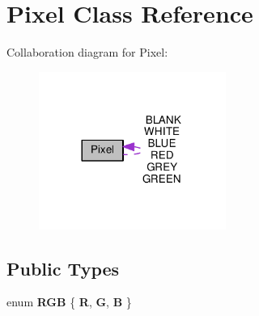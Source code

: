 \hypertarget{class_pixel}{}\section{Pixel Class Reference}
\label{class_pixel}


Collaboration diagram for Pixel\+:\nopagebreak
\begin{figure}[H]
\begin{center}
\leavevmode
\includegraphics[width=173pt]{class_pixel__coll__graph}
\end{center}
\end{figure}
\subsection*{Public Types}
\begin{DoxyCompactItemize}
\item 
enum {\bfseries R\+GB} \{ {\bfseries R}, 
{\bfseries G}, 
{\bfseries B}
 \}\hypertarget{class_pixel_ac2ab5194684b31a50d429b26a0569ed9}{}\label{class_pixel_ac2ab5194684b31a50d429b26a0569ed9}

\end{DoxyCompactItemize}
